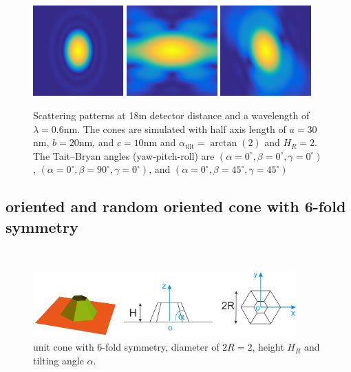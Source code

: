 \begin{figure}[htb]
\includegraphics[width=0.31\textwidth]{../images/form_factor/oriented_primitive_opbjects/cone_0_0_0_18m.png} \hfill
\includegraphics[width=0.31\textwidth]{../images/form_factor/oriented_primitive_opbjects/cone_0_90_0_18m.png}  \hfill \includegraphics[width=0.31\textwidth]{../images/form_factor/oriented_primitive_opbjects/cone_0_45_45_18m.png}
\caption{Scattering patterns at 18m detector distance and a wavelength of $\lambda=0.6$nm. The cones are simulated with half axis length of $a=30$nm, $b=20$nm, and $c=10$nm and $\alpha_\mathrm{tilt}=\arctan(2)$ and $H_R=2$. The Tait–Bryan angles (yaw-pitch-roll) are $(\alpha=0^\circ,\beta=0^\circ,\gamma=0^\circ)$, $(\alpha=0^\circ,\beta=90^\circ,\gamma=0^\circ)$, and $(\alpha=0^\circ,\beta=45^\circ,\gamma=45^\circ)$ }
\label{fig:opo_coneIQ2D}
\end{figure}

\subsection{oriented and random oriented cone with 6-fold symmetry} ~\\
\cite{Renaud2009}
\begin{figure}[htb]
\begin{center}
\includegraphics[width=0.9\textwidth]{../images/form_factor/oriented_primitive_opbjects/cone6.png}
\end{center}
\caption{unit cone with 6-fold symmetry, diameter of $2R=2$, height $H_R$ and tilting angle $\alpha$.}
\label{fig:opo_cone6}
\end{figure}


